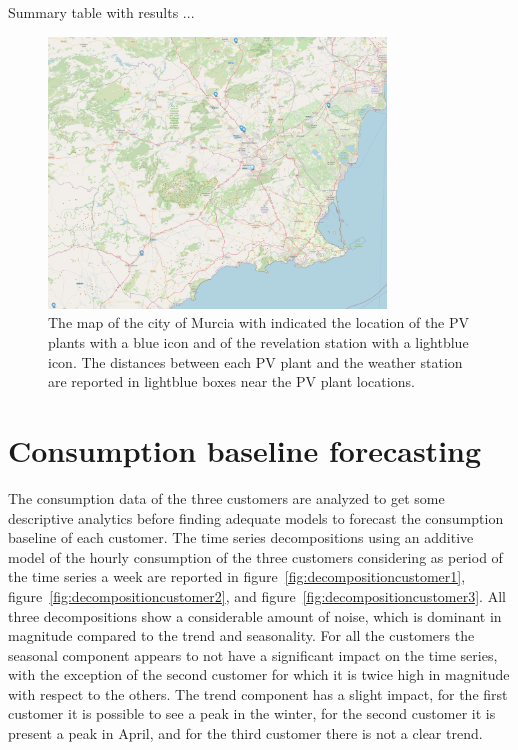 Summary table with results ...

\begin{figure}[H]
\centering
\includegraphics[width=0.8\textwidth]{images/production/pv_plants_map}
\caption{The map of the city of Murcia with indicated the location of the PV plants with a blue icon and of the revelation station with a lightblue icon. The distances between each PV plant and the weather station are reported in lightblue boxes near the PV plant locations.}
\label{fig:pvplantsmap}
\end{figure}


\section{Consumption baseline forecasting} 
\label{sec:baselineval}
\vspace{0.2 cm}

The consumption data of the three customers are analyzed to get some descriptive analytics before finding adequate models to forecast the consumption baseline of each customer.
The time series decompositions using an additive model of the hourly consumption of the three customers considering as period of the time series a week are reported in figure~\ref{fig:decompositioncustomer1}, figure~\ref{fig:decompositioncustomer2}, and figure~\ref{fig:decompositioncustomer3}.
All three decompositions show a considerable amount of noise, which is dominant in magnitude compared to the trend and seasonality.
For all the customers the seasonal component appears to not have a significant impact on the time series, with the exception of the second customer for which it is twice high in magnitude with respect to the others.
The trend component has a slight impact, for the first customer it is possible to see a peak in the winter, for the second customer it is present a peak in April, and for the third customer there is not a clear trend.

